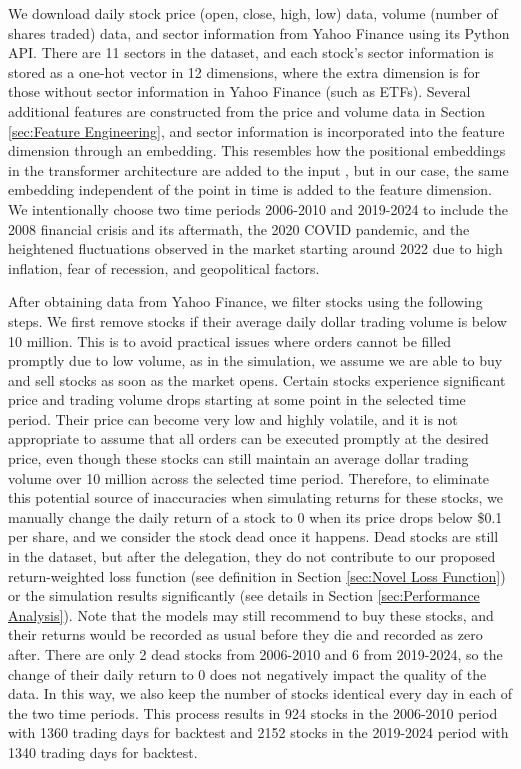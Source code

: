 \documentclass[preprint,12pt,numafflabel,authoryear]{elsarticle}
\begin{document}
We download daily stock price (open, close, high, low) data, volume (number of shares traded) data, and sector information from Yahoo Finance using its Python API. There are 11 sectors in the dataset, and each stock's sector information is stored as a one-hot vector in 12 dimensions, where the extra dimension is for those without sector information in Yahoo Finance (such as ETFs). Several additional features are constructed from the price and volume data in Section \ref{sec:Feature Engineering}, and sector information is incorporated into the feature dimension through an embedding. This resembles how the positional embeddings in the transformer architecture are added to the input \citep{vaswani2017attention}, but in our case, the same embedding independent of the point in time is added to the feature dimension. We intentionally choose two time periods 2006-2010 and 2019-2024 to include the 2008 financial crisis and its aftermath, the 2020 COVID pandemic, and the heightened fluctuations observed in the market starting around 2022 due to high inflation, fear of recession, and geopolitical factors.

After obtaining data from Yahoo Finance, we filter stocks using the following steps. We first remove stocks if their average daily dollar trading volume is below 10 million. This is to avoid practical issues where orders cannot be filled promptly due to low volume, as in the simulation, we assume we are able to buy and sell stocks as soon as the market opens. Certain stocks experience significant price and trading volume drops starting at some point in the selected time period. Their price can become very low and highly volatile, and it is not appropriate to assume that all orders can be executed promptly at the desired price, even though these stocks can still maintain an average dollar trading volume over 10 million across the selected time period. Therefore, to eliminate this potential source of inaccuracies when simulating returns for these stocks, we manually change the daily return of a stock to 0 when its price drops below \$0.1 per share, and we consider the stock dead once it happens. Dead stocks are still in the dataset, but after the delegation, they do not contribute to our proposed return-weighted loss function (see definition in Section \ref{sec:Novel Loss Function}) or the simulation results significantly (see details in Section \ref{sec:Performance Analysis}). Note that the models may still recommend to buy these stocks, and their returns would be recorded as usual before they die and recorded as zero after. There are only 2 dead stocks from 2006-2010 and 6 from 2019-2024, so the change of their daily return to 0 does not negatively impact the quality of the data. In this way, we also keep the number of stocks identical every day in each of the two time periods. This process results in 924 stocks in the 2006-2010 period with 1360 trading days for backtest and 2152 stocks in the 2019-2024 period with 1340 trading days for backtest.
\end{document}
